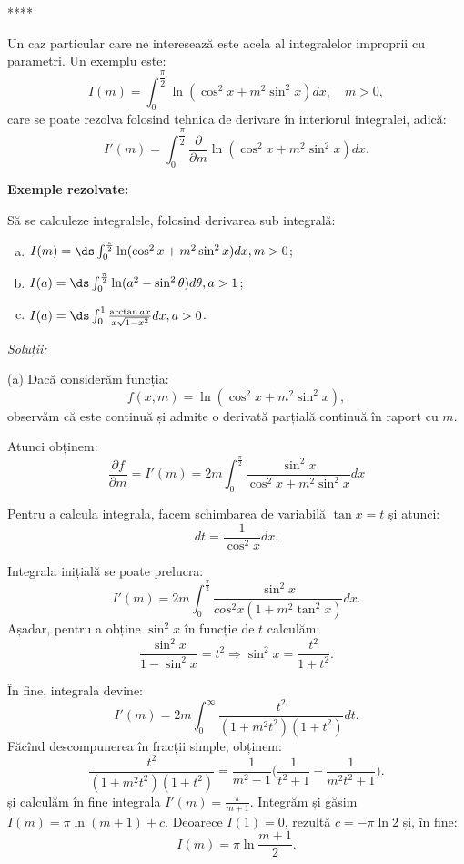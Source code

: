 \begin{center}
    {\Large *****}
\end{center}


Un caz particular care ne interesează este acela al integralelor
improprii cu parametri. Un exemplu este:
\[
    I(m) = \int_0^{\dfrac{\pi}{2}} \ln(\cos^2 x + m^2 \sin^2 x)dx, \quad m > 0,
\]
care se poate rezolva folosind tehnica de derivare în interiorul
integralei, adică:
\[
    I'(m) = \int_0^{\dfrac{\pi}{2}} \dfrac{\partial}{\partial m} %
    \ln(\cos^2 x + m^2 \sin^2 x) dx.
\]

\textbf{Exemple rezolvate:}

Să se calculeze integralele, folosind derivarea sub integrală:
\begin{enumerate}[(a)]
\item $ I(m) = \ds\int_0^{\frac{\pi}{2}} \ln(\cos^2 x + m^2 \sin^2 x) dx, m > 0 $;
\item $ I(a) = \ds\int_0^{\frac{\pi}{2}} \ln(a^2 - \sin^2 \theta) d\theta, a > 1 $;
\item $ I(a) = \ds\int_0^1 \frac{\arctan ax}{x \sqrt{1 - x^2}} dx, a > 0 $.
\end{enumerate}

\emph{Soluții:}

(a) Dacă considerăm funcția:
\[
  f(x, m) = \ln(\cos^2 x + m^2 \sin^2 x),
\]
observăm că este continuă și admite o derivată parțială continuă în raport cu $m$.

Atunci obținem:
\[
  \frac{\partial f}{\partial m} = I'(m) = 2m \int_0^{\frac{\pi}{2}} %
  \frac{\sin^2 x}{\cos^2 x + m^2 \sin^2 x} dx
\]

Pentru a calcula integrala, facem schimbarea de variabilă $\tan x = t$ și atunci:
\[
  dt = \frac{1}{\cos^2 x} dx.
\]

Integrala inițială se poate prelucra:
\[
  I'(m) = 2m \int_0^{\frac{\pi}{2}} \frac{\sin^2 x}{cos^2 x(1 + m^2 \tan^2 x)} dx.
\]
Așadar, pentru a obține $\sin^2 x$ în funcție de $t$ calculăm:
\[
  \frac{\sin^2 x}{1 - \sin^2 x} = t^2 \Rightarrow \sin^2 x = \frac{t^2}{1 + t^2}.
\]

În fine, integrala devine:
\[
  I'(m) = 2m \int_0^\infty \frac{t^2}{(1 + m^2 t^2)(1 + t^2)} dt.
\]
Făcînd descompunerea în fracții simple, obținem:
\[
  \frac{t^2}{(1 + m^2 t^2)(1 + t^2)} = \frac{1}{m^2 - 1} \Big( \frac{1}{t^2 + 1} - %
  \frac{1}{m^2 t^2 + 1} \Big).
\]
și calculăm în fine integrala $I'(m) = \frac{\pi}{m + 1}$. Integrăm și găsim
$I(m) = \pi \ln(m + 1) + c$. Deoarece $I(1) = 0$, rezultă $c = -\pi \ln 2$
și, în fine:
\[
  I(m) = \pi \ln \frac{m + 1}{2}.
\]

